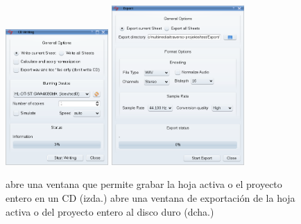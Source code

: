\begin{figure}[t]
 \centering
 \includegraphics[width=0.35\textwidth]{../images/exportdlg}\qquad
 \includegraphics[width=0.45\textwidth]{../images/exportdlg1}
 \caption{ abre una ventana que permite grabar la hoja activa o el proyecto entero en un CD (izda.)   abre una ventana de exportación de la hoja activa o del proyecto entero al disco duro (dcha.)}
 \label{fig_exportdlg}
\end{figure}

